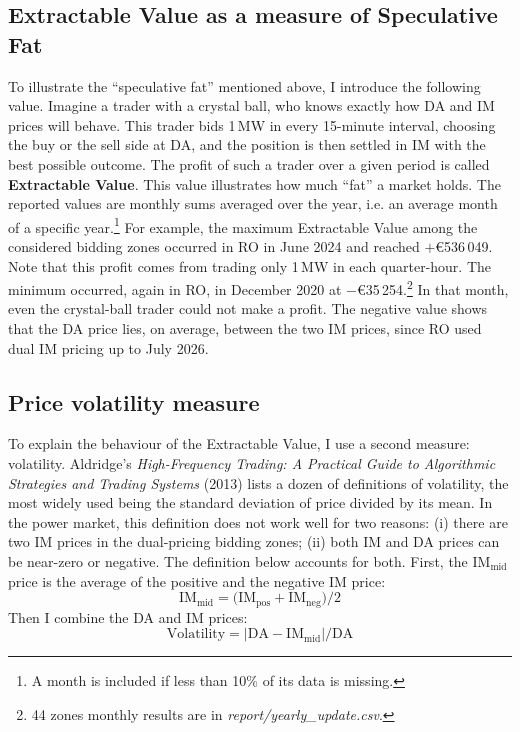 \documentclass[11pt,a4paper]{article}
\newcommand{\IM}[1]{\ensuremath{\mathrm{IM}_{\mathrm{#1}}}}
\begin{document}
\subsection{Extractable Value as a measure of Speculative Fat} \label{sec:ext_value_def}

To illustrate the ``speculative fat'' mentioned above, I introduce the following value. Imagine a trader with a crystal ball, who knows exactly how DA and IM prices will behave. This trader bids 1\,MW in every 15-minute interval, choosing the buy or the sell side at DA, and the position is then settled in IM with the best possible outcome. The profit of such a trader over a given period is called \textbf{Extractable Value}. This value illustrates how much ``fat'' a market holds. The reported values are monthly sums averaged over the year, i.e. an average month of a specific year.\footnote{A month is included if less than 10\% of its data is missing.} For example, the maximum Extractable Value among the considered bidding zones occurred in RO in June 2024 and reached $+$\euro536\,049. Note that this profit comes from trading only 1\,MW in each quarter-hour. The minimum occurred, again in RO, in December 2020 at $-$\euro35\,254.\footnote{44 zones monthly results are in \textit{report/yearly\_update.csv}.} In that month, even the crystal-ball trader could not make a profit. The negative value shows that the DA price lies, on average, between the two IM prices, since RO used dual IM pricing up to July 2026.

\subsection{Price volatility measure} \label{sec:volatility_def}

To explain the behaviour of the Extractable Value, I use a second measure: volatility. Aldridge's \textit{High-Frequency Trading: A Practical Guide to Algorithmic Strategies and Trading Systems} (2013) lists a dozen of definitions of volatility, the most widely used being the standard deviation of price divided by its mean. In the power market, this definition does not work well for two reasons: (i) there are two IM prices in the dual-pricing bidding zones; (ii) both IM and DA prices can be near-zero or negative. The definition below accounts for both. First, the \IM{mid} price is the average of the positive and the negative IM price:
\[
\IM{mid} = \bigl(\IM{pos} + \IM{neg}\bigr) / 2
\]
Then I combine the DA and IM prices:
\[
\mathrm{Volatility} = \left| \mathrm{DA} - \IM{mid} \right| / \mathrm{DA}
\]
\end{document}
